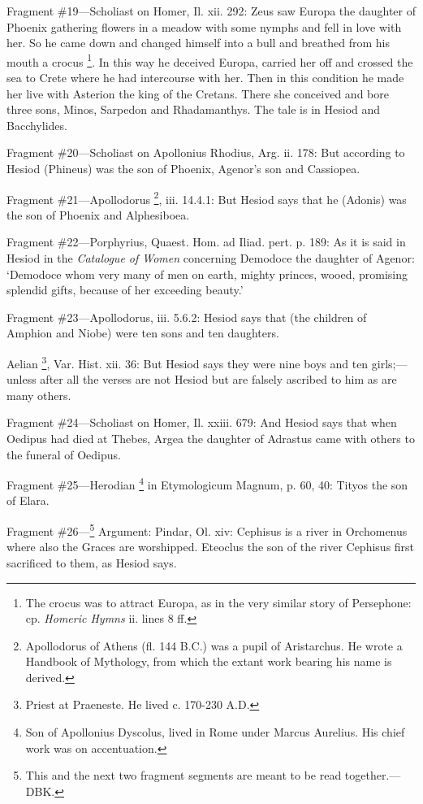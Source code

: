 Fragment \#19—Scholiast on Homer, Il. xii. 292: Zeus saw Europa the
daughter of Phoenix gathering flowers in a meadow with some nymphs and fell in
love with her. So he came down and changed himself into a bull and breathed
from his mouth a crocus \footnote{The crocus was to attract
Europa, as in the very similar story of Persephone: cp. \emph{Homeric
Hymns} ii. lines 8 ff.}. In this way he deceived Europa,
carried her off and crossed the sea to Crete where he had intercourse with her.
Then in this condition he made her live with Asterion the king of the Cretans.
There she conceived and bore three sons, Minos, Sarpedon and Rhadamanthys. The
tale is in Hesiod and Bacchylides.

Fragment \#20—Scholiast on Apollonius Rhodius, Arg. ii. 178: But according
to Hesiod (Phineus) was the son of Phoenix, Agenor’s son and Cassiopea.

Fragment \#21—Apollodorus \footnote{Apollodorus of Athens (fl.
144 B.C.) was a pupil of Aristarchus. He wrote a Handbook of Mythology, from
which the extant work bearing his name is derived.}, iii. 14.4.1: But Hesiod says
that he (Adonis) was the son of Phoenix and Alphesiboea.

Fragment \#22—Porphyrius, Quaest. Hom. ad Iliad. pert. p. 189: As it is
said in Hesiod in the \emph{Catalogue of Women} concerning Demodoce the
daughter of Agenor: ‘Demodoce whom very many of men on earth, mighty
princes, wooed, promising splendid gifts, because of her exceeding
beauty.’

Fragment \#23—Apollodorus, iii. 5.6.2: Hesiod says that (the children of
Amphion and Niobe) were ten sons and ten daughters.

Aelian \footnote{Priest at Praeneste. He
lived c. 170-230 A.D.}, Var. Hist. xii. 36: But Hesiod
says they were nine boys and ten girls;—unless after all the verses are
not Hesiod but are falsely ascribed to him as are many others.

Fragment \#24—Scholiast on Homer, Il. xxiii. 679: And Hesiod says that
when Oedipus had died at Thebes, Argea the daughter of Adrastus came with
others to the funeral of Oedipus.

Fragment \#25—Herodian \footnote{Son of Apollonius
Dyscolus, lived in Rome under Marcus Aurelius. His chief work was on
accentuation.} in Etymologicum Magnum, p. 60,
40: Tityos the son of Elara.

Fragment \#26—\footnote{This and the next two
fragment segments are meant to be read together.—DBK.} Argument: Pindar, Ol. xiv:
Cephisus is a river in Orchomenus where also the Graces are worshipped.
Eteoclus the son of the river Cephisus first sacrificed to them, as Hesiod
says.

